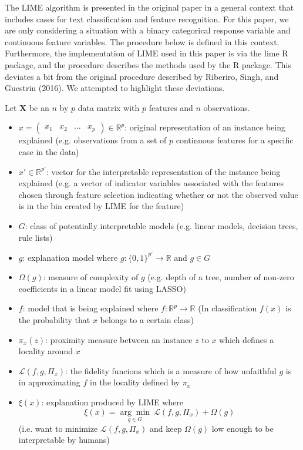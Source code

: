 \documentclass[AMS,STIX1COL]{WileyNJD-v2}
\begin{document}
The LIME algorithm is presented in the original paper in a general context that includes cases for text classification and feature recognition. For this paper, we are only considering a situation with a binary categorical response variable and continuous feature variables. The procedure below is defined in this context. Furthermore, the implementation of LIME used in this paper is via the lime R package, and the procedure describes the methods used by the R package. This deviates a bit from the original procedure described by Riberiro, Singh, and Guestrin (2016). We attempted to highlight these deviations.

Let $\textbf{X}$ be an $n$ by $p$ data matrix with $p$ features and $n$ observations.

\begin{itemize}
\item $x=\left(\begin{array}{cccc}x_1 & x_2 & \hdots & x_p\end{array}\right)\in\mathbb{R}^p$: original representation of an instance being explained (e.g. observations from a set of $p$ continuous features for a specific case in the data) %
\item $x'\in\mathbb{R}^{p'}$: vector for the interpretable representation of the instance being explained (e.g. a vector of indicator variables associated with the features chosen through feature selection indicating whether or not the observed value is in the bin created by LIME for the feature)
\item $G$: class of potentially interpretable models (e.g. linear models, decision trees, rule lists)
\item $g$: explanation model where $g:\{0,1\}^{p'}\rightarrow\mathbb{R}$ and $g\in G$
\item $\Omega(g)$: measure of complexity of $g$ (e.g. depth of a tree, number of non-zero coefficients in a linear model fit using LASSO)
\item $f$: model that is being explained where $f:\mathbb{R}^p\rightarrow\mathbb{R}$ (In classification $f(x)$ is the probability that $x$ belongs to a certain class)
\item $\pi_x(z)$: proximity measure between an instance $z$ to $x$ which defines a locality around $x$
\item $\mathcal{L}(f, g, \Pi_x)$: the fidelity funcions which is a measure of how unfaithful $g$ is in approximating $f$ in the locality defined by $\pi_x$
\item $\xi(x)$: explanation produced by LIME where
  $$\xi(x)=\underset{g\in G}{\arg\min} \ \mathcal{L}(f, g, \Pi_x)+\Omega(g)$$
(i.e. want to minimize $\mathcal{L}(f, g, \Pi_x)$ and keep $\Omega(g)$ low enough to be interpretable by humans)
\end{itemize}
\end{document}
